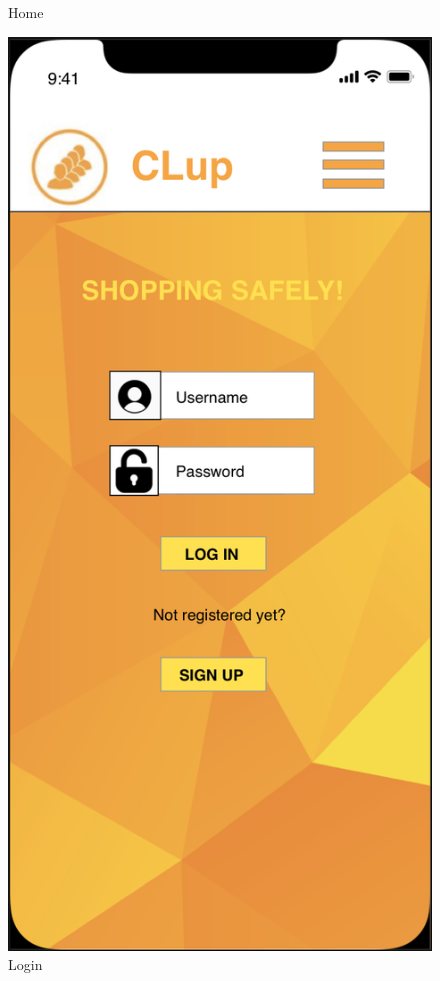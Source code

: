 \documentclass{article}
\begin{document}
\begin{figure}[H]
\begin{minipage}[b]{0.4\textwidth}
\caption{Home}
\end{minipage}
\hfill
\begin{minipage}[b]{0.4\textwidth}
\centering
\includegraphics[width=\textwidth]{login.png}
\caption{Login}
\end{minipage}
\end{figure}
\end{document}
